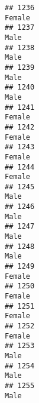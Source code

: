 \documentclass[]{article}
\begin{document}
\begin{verbatim}
## 1236                                                                                                                          Female
## 1237                                                                                                                            Male
## 1238                                                                                                                            Male
## 1239                                                                                                                            Male
## 1240                                                                                                                            Male
## 1241                                                                                                                          Female
## 1242                                                                                                                          Female
## 1243                                                                                                                          Female
## 1244                                                                                                                          Female
## 1245                                                                                                                            Male
## 1246                                                                                                                            Male
## 1247                                                                                                                            Male
## 1248                                                                                                                            Male
## 1249                                                                                                                          Female
## 1250                                                                                                                          Female
## 1251                                                                                                                          Female
## 1252                                                                                                                          Female
## 1253                                                                                                                            Male
## 1254                                                                                                                            Male
## 1255                                                                                                                            Male

\end{verbatim}
\end{document}
